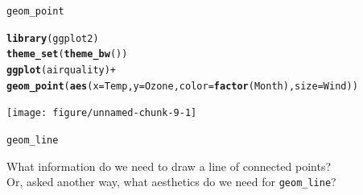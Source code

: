 \documentclass[table]{beamer}\usepackage[]{graphicx}\usepackage[]{xcolor}
\makeatletter
\newcommand{\hlopt}[1]{\textcolor[rgb]{0,0,0}{#1}}%
\newcommand{\hlstd}[1]{\textcolor[rgb]{0.345,0.345,0.345}{#1}}%
\newcommand{\hlkwc}[1]{\textcolor[rgb]{0.333,0.667,0.333}{#1}}%
\newcommand{\hlkwd}[1]{\textcolor[rgb]{0.737,0.353,0.396}{\textbf{#1}}}%
\newenvironment{kframe}{%
 \def\at@end@of@kframe{}%
 \ifinner\ifhmode%
  \def\at@end@of@kframe{\end{minipage}}%
  \begin{minipage}{\columnwidth}%
 \fi\fi%
 \def\FrameCommand##1{\hskip\@totalleftmargin \hskip-\fboxsep
 \colorbox{shadecolor}{##1}\hskip-\fboxsep
     \hskip-\linewidth \hskip-\@totalleftmargin \hskip\columnwidth}%
 \MakeFramed {\advance\hsize-\width
   \@totalleftmargin\z@ \linewidth\hsize
   \@setminipage}}%
 {\par\unskip\endMakeFramed%
 \at@end@of@kframe}
\newenvironment{knitrout}{}{} %
\makeatother
\begin{document}

\begin{frame}[fragile]{\tt{geom\_point}}

\scriptsize
\begin{knitrout}
\color{fgcolor}\begin{kframe}
\begin{alltt}
\hlkwd{library}\hlstd{(ggplot2)}
\hlkwd{theme_set}\hlstd{(}\hlkwd{theme_bw}\hlstd{())}
\hlkwd{ggplot}\hlstd{(airquality)} \hlopt{+}
  \hlkwd{geom_point}\hlstd{(}\hlkwd{aes}\hlstd{(}\hlkwc{x}\hlstd{=Temp,} \hlkwc{y}\hlstd{=Ozone,} \hlkwc{color}\hlstd{=}\hlkwd{factor}\hlstd{(Month),} \hlkwc{size}\hlstd{=Wind))}
\end{alltt}
\end{kframe}
\texttt{[image: figure/unnamed-chunk-9-1]} 
\end{knitrout}


\end{frame}

\begin{frame}[fragile]{\tt{geom\_line}}

What information do we need to draw a line of connected points? \\
Or, asked another way, what aesthetics do we need for {\tt geom\_line}?

\end{frame}


\end{document}
